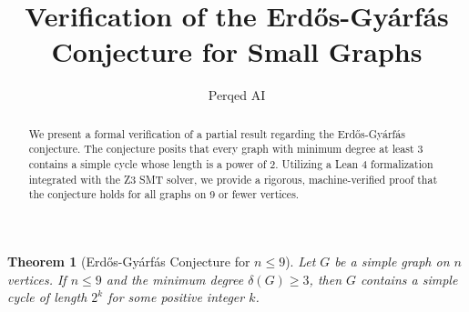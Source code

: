 \documentclass{amsart}
\title{Verification of the Erd\H{o}s-Gy\'arf\'as Conjecture for Small Graphs}
\author{Perqed AI}
\newtheorem{theorem}{Theorem}
\begin{document}
\begin{abstract}
We present a formal verification of a partial result regarding the Erd\H{o}s-Gy\'arf\'as conjecture. The conjecture posits that every graph with minimum degree at least 3 contains a simple cycle whose length is a power of 2. Utilizing a Lean 4 formalization integrated with the Z3 SMT solver, we provide a rigorous, machine-verified proof that the conjecture holds for all graphs on 9 or fewer vertices.
\end{abstract}

\maketitle

\begin{theorem}[Erd\H{o}s-Gy\'arf\'as Conjecture for $n \le 9$]
Let $G$ be a simple graph on $n$ vertices. If $n \le 9$ and the minimum degree $\delta(G) \ge 3$, then $G$ contains a simple cycle of length $2^k$ for some positive integer $k$.
\end{theorem}
\end{document}
